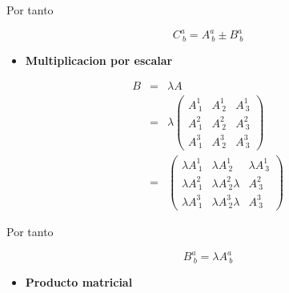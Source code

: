 \documentclass[12pt]{report}
\begin{document}
Por tanto

\begin{equation} \label{2.65}
C^a_{\ b} = A^a_{\ b} \pm B^a_{\ b}
\end{equation}



\begin{itemize}
 \item \textbf{Multiplicacion por escalar} \\
\end{itemize}


\begin{eqnarray} \nonumber
B&=& \lambda A \\
&=& \lambda
\left( 
\begin{array}{ccc} \nonumber
A^1_{\ 1} & A^1_{\ 2} & A^1_{\ 3} \\
A^2_{\ 1} & A^2_{\ 2} & A^2_{\ 3} \\
A^3_{\ 1} & A^3_{\ 2} & A^3_{\ 3}
\end{array}
\right) \\
&=&
\left( 
\begin{array}{ccc} \nonumber
\lambda A^1_{\ 1} & \lambda  A^1_{\ 2} & \lambda  A^1_{\ 3} \\
\lambda  A^2_{\ 1} & \lambda  A^2_{\ 2} \lambda  & A^2_{\ 3} \\
\lambda  A^3_{\ 1} & \lambda  A^3_{\ 2} \lambda  & A^3_{\ 3}
\end{array}
\right)
\end{eqnarray}

Por tanto 

\begin{equation}\label{2.66}
B^a_{\ b}= \lambda A^a_{\ b}
\end{equation}

\begin{itemize}
 \item \textbf{Producto matricial} \\
\end{itemize}
\end{document}
